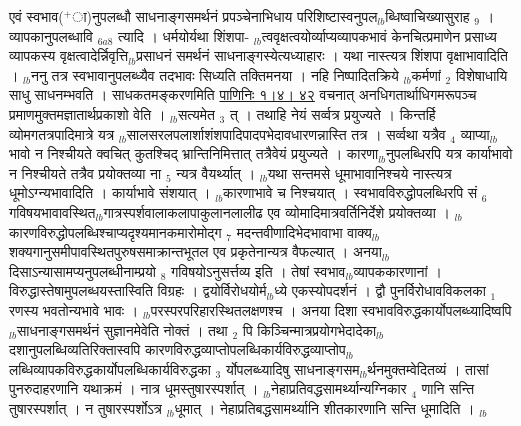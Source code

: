 \documentclass[article,12pt,a4paper]{memoir}%
\newcommand{\add}[1]{($^{+}$#1)}
\newcounter{parCount}
\begin{document}
	  
	  \pstart \leavevmode%
	एवं स्वभाव\add{ा}नुपलब्धौ साधनाङ्गसमर्थनं प्रपञ्चेनाभिधाय परिशिष्टास्वनुपल{\tiny $_{lb}$}ब्धिष्वाचिख्यासुराह {\tiny $_{9}$} \leavevmode{} । {\color{DodgerBlue3}व्यापकानुपलब्धावि} {\tiny $_{6a8}$} त्यादि । धर्मयोर्यथा शिंशपा- {\tiny $_{lb}$}त्ववृक्षत्वयोर्व्याप्यव्यापकभावं केनचित्प्रमाणेन प्रसाध्य व्यापकस्य वृक्षत्वादेर्न्निवृत्ति{\tiny $_{lb}$}प्रसाधनं समर्थनं साधनाङ्गस्येत्यध्याहारः । यथा नास्त्यत्र शिंशपा वृक्षाभावादिति । {\tiny $_{lb}$}ननु तत्र स्वभावानुपलब्ध्यैव तदभावः सिध्यति तक्तिमनया । नहि निष्पादितक्रिये {\tiny $_{lb}$}कर्मणां {\tiny $_{2}$} विशेषाधायि साधु साधनम्भवति । {\color{DodgerBlue3}साधकतमङ्करणमिति} \href{http://sarit.indology.info/?cref=P\%C4\%81.1.4}{पाणिनिः १।४। ४२} वचनात् अनधिगतार्थाधिगमरूपञ्च प्रमाणमुक्तमज्ञातार्थप्रकाशो वेति । {\tiny $_{lb}$}सत्यमेत {\tiny $_{3}$} त् । तथाहि नेयं सर्व्वत्र प्रयुज्यते । किन्तर्हि व्योमगतत्रपादिमात्रे यत्र {\tiny $_{lb}$}सालसरलपलार्शाशंशपादिपादपभेदावधारणन्नास्ति तत्र । सर्व्वथा यत्रैव {\tiny $_{4}$} व्याप्या{\tiny $_{lb}$} \leavevmode{} भावो न निश्चीयते क्वचित् कुतश्चिद् भ्रान्तिनिमित्तात् तत्रैवेयं प्रयुज्यते । कारणा{\tiny $_{lb}$}नुपलब्धिरपि यत्र कार्याभावो न निश्चीयते तत्रैव प्रयोक्तव्या ना {\tiny $_{5}$} न्यत्र वैयर्थ्यात् । {\tiny $_{lb}$}यथा सन्तमसे धूमाभावानिश्चये नास्त्यत्र धूमोऽग्न्यभावादिति । कार्याभावे संशयात् । {\tiny $_{lb}$}कारणाभावे च निश्चयात् । स्वभावविरुद्धोपलब्धिरपि सं {\tiny $_{6}$} गविषयभावावस्थित{\tiny $_{lb}$}गात्रस्पर्शवालाकलापाकुलानलालीढ एव व्योमादिमात्रवर्तिनिर्देशे प्रयोक्तव्या । {\tiny $_{lb}$}कारणविरुद्धोपलब्धिश्चाप्यदृश्यमानकमारोमोद्ग {\tiny $_{7}$} \leavevmode{}मदन्तवीणादिभेदभावाभा वाक्य{\tiny $_{lb}$}शक्यगानुसमीपावस्थितपुरुषसमाक्रान्तभूतल एव प्रकृतेनान्यत्र वैफल्यात् । अनया{\tiny $_{lb}$}दिसाऽन्यासामप्यनुपलब्धीनाम्प्रयो {\tiny $_{8}$} गविषयोऽनुसर्त्तव्य इति । तेषां स्वभाव{\tiny $_{lb}$}व्यापककारणानां । विरुद्धास्तेषामुपलब्धयस्तास्विति विग्रहः । द्वयोर्विरोधयोर्म{\tiny $_{lb}$}ध्ये एकस्योपदर्शनं । द्वौ पुनर्विरोधावविकलका {\tiny $_{1}$} रणस्य भवतोन्यभावे भावः । {\tiny $_{lb}$}परस्परपरिहारस्थितलक्षणश्च । अनया दिशा स्वभावविरुद्धकार्योपलब्ध्यादिष्वपि {\tiny $_{lb}$}साधनाङ्गसमर्थनं सुज्ञानमेवेति नोक्तं । तथा {\tiny $_{2}$} पि किञ्चिन्मात्रप्रयोगभेदादेका{\tiny $_{lb}$}दशानुपलब्धिव्यतिरिक्तास्वपि कारणविरुद्धव्याप्तोपलब्धिकार्यविरुद्धव्याप्तोप{\tiny $_{lb}$}लब्धिव्यापकविरुद्धकार्योपलब्धिकार्यविरुद्धका {\tiny $_{3}$} र्योपलब्ध्यादिषु साधनाङ्गसम{\tiny $_{lb}$}र्थनमुक्तम्वेदितव्यं । तासां पुनरुदाहरणानि यथाक्रमं । नात्र धूमस्तुषारस्पर्शात् । {\tiny $_{lb}$}नेहाप्रतिवद्धसामर्थ्यान्यग्निकार {\tiny $_{4}$} णानि सन्ति तुषारस्पर्शात् । न तुषारस्पर्शोऽत्र {\tiny $_{lb}$}धूमात् । नेहाप्रतिबद्धसामर्थ्यानि शीतकारणानि सन्ति धूमादिति ।
	{}
	\pend%
      {\tiny $_{lb}$}
	  \bigskip
	  \begingroup
	
\end{document}
